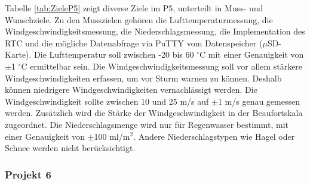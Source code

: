 \begin{landscape}
Tabelle \ref{tab:ZieleP5} zeigt diverse Ziele im P5, unterteilt in Muss- und Wunschziele. Zu den Musszielen gehören die Lufttemperaturmessung, die Windgeschwindigkeitsmessung, die Niederschlagsmessung, die Implementation des RTC und die mögliche Datenabfrage via PuTTY vom Datenspeicher ($\mu$SD-Karte). Die Lufttemperatur soll zwischen -20 bis 60 $^\circ$C mit einer Genauigkeit von $\pm$1 $^\circ$C ermittelbar sein. Die Windgeschwindigkeitsmessung soll vor allem stärkere Windgeschwindigkeiten erfassen, um vor Sturm warnen zu können. Deshalb können niedrigere Windgeschwindigkeiten vernachlässigt werden. Die Windgeschwindigkeit sollte zwischen 10 und 25 m/s auf $\pm$1 m/s genau gemessen werden. Zusätzlich wird die Stärke der Windgeschwindigkeit in der Beaufortskala zugeordnet. Die Niederschlagsmenge wird nur für Regenwasser bestimmt, mit einer Genauigkeit von $\pm$100 ml/m$^2$. Andere Niederschlagstypen wie Hagel oder Schnee werden nicht berücksichtigt.\\

\newpage

\subsubsection{Projekt 6}
\label{subsubsec:Projekt6}


\end{landscape}
